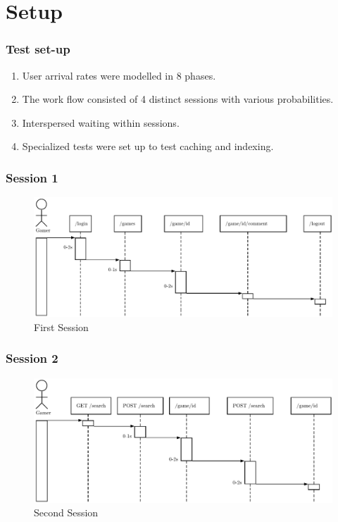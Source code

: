 \section{Setup}
\begin{frame}
\frametitle{Test set-up}

\begin{enumerate}[<+->]
	\setlength\itemsep{1em}
	\item User arrival rates were modelled in 8 phases.
	\item The work flow consisted of 4 distinct sessions with various probabilities.
	\item Interspersed waiting within sessions.
	\item Specialized tests were set up to test caching and indexing.  
\end{enumerate}
\end{frame}

\begin{frame}
\frametitle{Session 1}
\begin{figure}[h]
	\centering
	\includegraphics[width=1\textwidth, height=0.5\textheight]{images/generic-1.pdf}
	\caption{First Session}\label{fig:sqlopt}
\end{figure}
\end{frame}

\begin{frame}
\frametitle{Session 2}
\begin{figure}[h]
	\centering
	\includegraphics[width=1\textwidth, height=0.5\textheight]{images/generic-2.pdf}
	\caption{Second Session}\label{fig:sqlopt}
\end{figure}
\end{frame}


